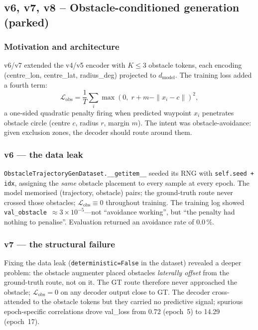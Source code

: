 \documentclass[11pt,a4paper]{article}
\begin{document}
\subsection{v6, v7, v8 -- Obstacle-conditioned generation (parked)}
\label{sec:v6v7}

\subsubsection{Motivation and architecture}

v6/v7 extended the v4/v5 encoder with $K\le3$ obstacle tokens, each encoding
(centre\_lon, centre\_lat, radius\_deg) projected to $d_\text{model}$.
The training loss added a fourth term:
\begin{equation}
  \mathcal{L}_\text{obs} = \frac{1}{T}\sum_i
    \max\!\left(0,\; r + m - \|x_i - c\|\right)^2,
  \label{eq:obstacle-loss}
\end{equation}
a one-sided quadratic penalty firing when predicted waypoint $x_i$ penetrates
obstacle circle (centre $c$, radius $r$, margin $m$).
The intent was obstacle-avoidance: given exclusion zones, the decoder should route
around them.

\subsubsection{v6 --- the data leak}

\texttt{ObstacleTrajectoryGenDataset.\_\_getitem\_\_} seeded its RNG with
\texttt{self.seed + idx}, assigning the \emph{same} obstacle placement to every
sample at every epoch.
The model memorised (trajectory, obstacle) pairs; the ground-truth route never
crossed those obstacles; $\mathcal{L}_\text{obs} \equiv 0$ throughout training.
The training log showed \texttt{val\_obstacle}~$\approx 3\times10^{-5}$---not
``avoidance working'', but ``the penalty had nothing to penalise''.
Evaluation returned an avoidance rate of 0.0\,\%.

\subsubsection{v7 --- the structural failure}

Fixing the data leak (\texttt{deterministic=False} in the dataset) revealed a
deeper problem: the obstacle augmenter placed obstacles \emph{laterally offset} from
the ground-truth route, not on it.
The GT route therefore never approached the obstacle;
$\mathcal{L}_\text{obs} = 0$ on any decoder output close to GT.
The decoder cross-attended to the obstacle tokens but they carried no predictive
signal; spurious epoch-specific correlations drove val\_loss from 0.72 (epoch~5)
to 14.29 (epoch~17).
\end{document}
